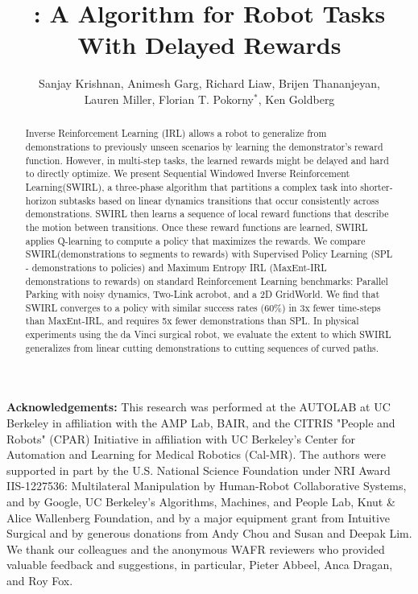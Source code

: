 \documentclass[Afour,sageh,times]{sagej}
\title{\LARGE \bf \hirl: A \hirlfull Algorithm for Robot Tasks With Delayed Rewards}
\author{%
Sanjay Krishnan, 
Animesh Garg, 
Richard Liaw,
Brijen Thananjeyan,\\
Lauren Miller,
Florian T. Pokorny$^{*}$,
Ken Goldberg%
}
\affiliation{\affilnum{1}AUTOLAB UC Berkeley\\
\affilnum{2}KTH Sweden}
\newcommand{\hirl}{SWIRL\xspace}
\newcommand{\hirlfull}{Sequential Windowed Inverse Reinforcement Learning\xspace}
\begin{document}
\begin{abstract}
Inverse Reinforcement Learning (IRL) allows a robot to generalize from demonstrations to previously unseen scenarios by learning the demonstrator's reward function.
However, in multi-step tasks, the learned rewards might be delayed and hard to directly optimize.
We present \hirlfull (\hirl), a three-phase algorithm that partitions a complex task into shorter-horizon subtasks based on linear dynamics transitions that occur consistently across demonstrations.
\hirl then learns a sequence of local reward functions that describe the motion between transitions. 
Once these reward functions are learned, \hirl applies Q-learning to compute a policy that maximizes the rewards. 
We compare \hirl (demonstrations to segments to rewards) with Supervised Policy Learning (SPL - demonstrations to policies) and Maximum Entropy IRL (MaxEnt-IRL demonstrations to rewards) on standard Reinforcement Learning benchmarks: Parallel Parking with noisy dynamics, Two-Link acrobot, and a 2D GridWorld.
We find that \hirl converges to a policy with similar success rates (60\%) in 3x fewer time-steps than MaxEnt-IRL, and requires 5x fewer demonstrations than SPL.
In physical experiments using the da Vinci surgical robot, we evaluate the extent to which \hirl generalizes from linear cutting demonstrations to cutting sequences of curved paths.
\end{abstract} 

\maketitle







%
%
%
%

% 



\vspace{0.5em}

{\footnotesize 
\noindent \textbf{Acknowledgements:}
This research was performed at the AUTOLAB at UC Berkeley in
affiliation with the AMP Lab, BAIR, and the CITRIS "People and Robots" (CPAR) Initiative in affiliation with UC Berkeley's Center for Automation and Learning for Medical Robotics (Cal-MR). The authors were supported in part by the U.S. National Science Foundation under NRI Award IIS-1227536: Multilateral Manipulation by Human-Robot Collaborative Systems, and by Google, UC Berkeley's Algorithms, Machines, and People Lab, Knut \& Alice Wallenberg Foundation, and by a major equipment grant from Intuitive Surgical and by generous donations from Andy Chou and Susan and Deepak Lim. We thank our colleagues and the anonymous WAFR reviewers who provided valuable feedback and suggestions, in particular, Pieter Abbeel, Anca Dragan, and Roy Fox.}






%
\end{document}
